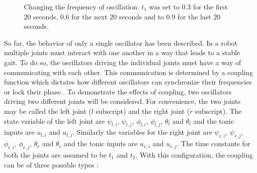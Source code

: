 \documentclass[12pt,twoside]{article}
\theoremstyle{plain}
\theoremstyle{definition}
\theoremstyle{remark}
\newcommand{\forceindent}{\leavevmode{\parindent=2em\indent}}
\begin{document}
\begin{figure}[H]
\centering     %
{}
\caption{Changing the frequency of oscillation. $t_1$ was set to 0.3 for the first 20 seconds, 0.6 for the next 20 seconds and to 0.9 for the last 20 seconds.}
\label{fig:change-freq}
\end{figure}


\forceindent So far, the behavior of only a single oscillator has been described. In a robot multiple joints must interact with one another in a way that leads to a stable gait. To do so, the oscillators driving the individual joints must have a way of communicating with each other. This communication is determined by a coupling function which dictates how different oscillators can synchronize their frequencies or lock their phase \cite{Ronsse2009}. To demonstrate the effects of coupling, two oscillators driving two different joints will be considered. For convenience, the two joints may be called the left joint ($l$ subscript) and the right joint ($r$ subscript). The state variable of the left joint are $\psi_{l,i}$, $\psi_{l,j}$, $\phi_{l,i}$, $\phi_{l,j}$, $\theta_l$ and $\dot{\theta_l}$ and the tonic inputs are $u_{l,i}$ and $u_{l,j}$. Similarly the variables for the right joint are $\psi_{r,i}$, $\psi_{r,j}$, $\phi_{r,i}$, $\phi_{r,j}$, $\theta_r$ and $\dot{\theta_r}$ and the tonic inputs are $u_{r,i}$ and $u_{r,j}$. The time constants for both the joints are assumed to be $t_1$ and $t_2$. With this configuration, the coupling can be of three possible types \cite{Ronsse2009}:
\end{document}
